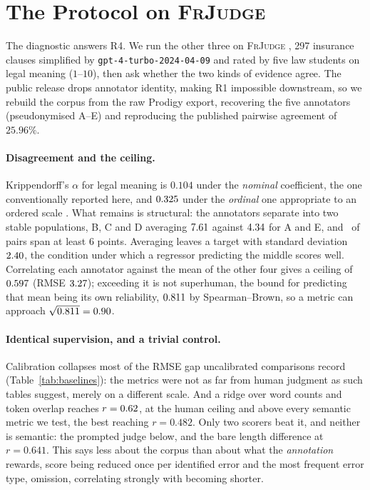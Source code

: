\documentclass[11pt]{article}
\begin{document}
\section{The Protocol on \textsc{FrJudge}}
\label{sec:casestudy}

The diagnostic answers R4. We run the other three on \textsc{FrJudge}
\citep{beauchemin2025judgebert}, 297 insurance clauses simplified by
\texttt{gpt-4-turbo-2024-04-09} and rated by five law students on legal meaning
($1$--$10$), then ask whether the two kinds of evidence agree. The public
release drops annotator identity, making R1 impossible downstream, so we rebuild
the corpus from the raw Prodigy export, recovering the five annotators
(pseudonymised A--E) and reproducing the published pairwise agreement of
$25.96\%$.

\paragraph{Disagreement and the ceiling.}
Krippendorff's $\alpha$ for legal meaning is $0.104$ under the \emph{nominal}
coefficient, the one conventionally reported here, and $0.325$ under the
\emph{ordinal} one appropriate to an ordered scale
\citep{krippendorff2004content}. What remains is structural: the annotators
separate into two stable populations, B, C and D averaging $7.61$
against $4.34$ for A and E, and \pctSpreadSix\ of pairs span at least $6$
points. Averaging leaves a target with standard deviation $2.40$, the
condition under which a regressor predicting the middle scores well. Correlating each annotator against the mean of the other four gives a
ceiling of $0.597$ (RMSE $3.27$); exceeding it is not superhuman, the
bound for predicting that mean being its own reliability, $0.811$ by
Spearman--Brown, so a metric can approach $\sqrt{0.811}=0.90$.

\paragraph{Identical supervision, and a trivial control.}
Calibration collapses most of the RMSE gap uncalibrated comparisons record
(Table~\ref{tab:baselines}): the metrics were not as far from human judgment as
such tables suggest, merely on a different scale. And a ridge over word counts
and token overlap reaches $r=0.62$, at the human ceiling and above every
semantic metric we test, the best reaching $r=0.482$. Only two scorers beat it,
and neither is semantic: the prompted judge below, and the bare length
difference at $r=0.641$. This says less about the corpus than about what the
\emph{annotation} rewards, score being reduced once per identified error and the
most frequent error type, omission, correlating strongly with becoming shorter.
\end{document}
